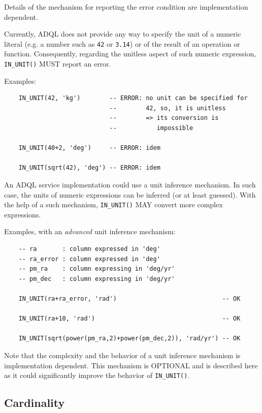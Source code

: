 \documentclass[11pt,a4paper]{ivoa}
\begin{document}
Details of the mechanism for reporting the error condition are implementation
dependent.

Currently, ADQL does not provide any way to specify the unit of a numeric
literal (e.g. a number such as \verb:42: or \verb:3.14:) or of the result of an
operation or function. Consequently, regarding the unitless aspect of such
numeric expression, \verb:IN_UNIT(): MUST report an error.

Examples:

\begin{verbatim}
    IN_UNIT(42, 'kg')        -- ERROR: no unit can be specified for
                             --        42, so, it is unitless
                             --        => its conversion is
                             --           impossible

    IN_UNIT(40+2, 'deg')     -- ERROR: idem

    IN_UNIT(sqrt(42), 'deg') -- ERROR: idem
\end{verbatim}

An ADQL service implementation could use a unit inference mechanism. In such
case, the units of numeric expressions can be inferred (or at least
guessed). With the
help of a such mechanism, \verb:IN_UNIT(): MAY convert more complex
expressions.

Examples, with an \emph{advanced} unit inference mechanism:

\begin{verbatim}
    -- ra       : column expressed in 'deg'
    -- ra_error : column expressed in 'deg'
    -- pm_ra    : column expressing in 'deg/yr'
    -- pm_dec   : column expressing in 'deg/yr'

    IN_UNIT(ra+ra_error, 'rad')                             -- OK

    IN_UNIT(ra+10, 'rad')                                   -- OK

    IN_UNIT(sqrt(power(pm_ra,2)+power(pm_dec,2)), 'rad/yr') -- OK
\end{verbatim}

Note that the complexity and the behavior of a unit inference mechanism is
implementation dependent. This mechanism is OPTIONAL and is described here
as it could significantly improve the behavior of \verb:IN_UNIT():.

\subsection{Cardinality}
\label{sec:cardinality}
\end{document}
